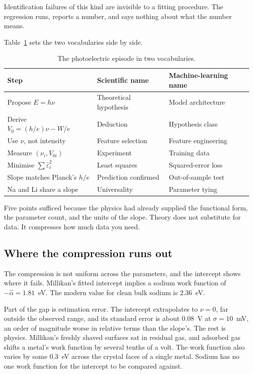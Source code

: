 \documentclass[11pt]{article}
\begin{document}
Identification failures of this kind are invisible to a fitting procedure.  The
regression runs, reports a number, and says nothing about what the number
means.

Table~\ref{tab:loop} sets the two vocabularies side by side.

\begin{table}[ht]
\centering
\caption{The photoelectric episode in two vocabularies.}
\label{tab:loop}
\medskip
\begin{tabular}{p{4.3cm}p{3.6cm}p{4.3cm}}
\toprule
Step & Scientific name & Machine-learning name \\
\midrule
Propose $E = h\nu$ & Theoretical hypothesis & Model architecture \\
Derive $V_0 = (h/e)\nu - W/e$ & Deduction & Hypothesis class \\
Use $\nu$, not intensity & Feature selection & Feature engineering \\
Measure $(\nu_i, V_{0i})$ & Experiment & Training data \\
Minimise $\sum \hat\varepsilon_i^2$ & Least squares & Squared-error loss \\
Slope matches Planck's $h/e$ & Prediction confirmed & Out-of-sample test \\
Na and Li share a slope & Universality & Parameter tying \\
\bottomrule
\end{tabular}
\end{table}

Five points sufficed because the physics had already supplied the functional
form, the parameter count, and the units of the slope.  Theory does not
substitute for data.  It compresses how much data you need.

\subsection*{Where the compression runs out}

The compression is not uniform across the parameters, and the intercept shows
where it fails.  Millikan's fitted intercept implies a sodium work function of
$-\hat\alpha = 1.81$~eV.  The modern value for clean bulk sodium is $2.36$~eV.

Part of the gap is estimation error.  The intercept extrapolates to $\nu = 0$,
far outside the observed range, and its standard error is about $0.08$~V at
$\sigma = 10$~mV, an order of magnitude worse in relative terms than the
slope's.  The rest is physics.  Millikan's freshly shaved surfaces sat in
residual gas, and adsorbed gas shifts a metal's work function by several
tenths of a volt.  The work function also varies by some $0.3$~eV across the
crystal faces of a single metal.  Sodium has no one work function for the
intercept to be compared against.
\end{document}
